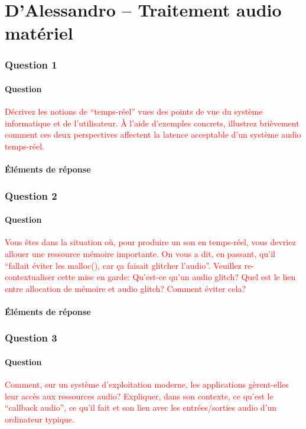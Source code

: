 \documentclass[letterpaper, 12pt]{article}
\newcommand{\alinea}{
\hspace*{0.5cm}}
\newcommand{\red}[1]{
	\textcolor{red}{#1}}
\begin{document}
\part{D'Alessandro -- Traitement audio matériel}
	\section{Question 1}
		\subsection{Question}
			\alinea \red{Décrivez les notions de “temps-réel” vues des points de vue du système informatique et de l’utilisateur. 
				À l’aide d’exemples concrets, illustrez brièvement comment ces deux perspectives affectent la latence acceptable d’un 
				système audio temps-réel.}
		\subsection{\'Eléments de réponse}
			\alinea %
	\section{Question 2}
		\subsection{Question}
			\alinea  \red{Vous êtes dans la situation où, pour produire un son en temps-réel, vous devriez allouer une ressource mémoire
				importante. On vous a dit, en passant, qu’il “fallait éviter les malloc(), car ça faisait glitcher l’audio”. 
				Veuillez re-contextualiser cette mise en garde: Qu’est-ce qu’un audio glitch? Quel est le lien entre allocation de 
				mémoire et audio glitch? Comment éviter cela?}
		\subsection{\'Eléments de réponse}
			\alinea %
	\section{Question 3}
		\subsection{Question}
			\alinea \red{Comment, sur un système d’exploitation moderne, les applications gèrent-elles leur accès aux ressources audio? 
				Expliquer, dans son contexte, ce qu’est le “callback audio”, ce qu’il fait et son lien avec les entrées/sorties 
				audio d’un ordinateur typique.}
\end{document}
